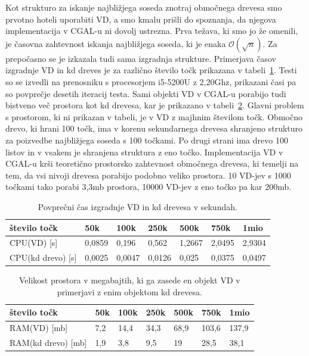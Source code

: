 \documentclass[a4paper, 12pt]{book}
\newcommand{\OO}{\ensuremath{\mathcal{O}}} %
\begin{document}
Kot strukturo za iskanje najbližjega soseda znotraj območnega drevesa smo prvotno hoteli uporabiti VD, a smo kmalu prišli do spoznanja, da njegova implementacija v CGAL-u ni dovolj ustrezna. Prva težava, ki smo jo že omenili, je časovna zahtevnost iskanja najbližjega soseda, ki je enaka $\OO(\sqrt{n})$. Za prepočasno se je izkazala tudi sama izgradnja strukture. Primerjava časov izgradnje VD in kd dreves je za različno število točk prikazana v tabeli~\ref{cpu-compare}. Testi so se izvedli na prenosniku s procesorjem i5-5200U z 2,20Ghz, prikazani časi pa so povprečje desetih iteracij testa. Sami objekti VD v CGAL-u porabijo tudi bistveno več prostora kot kd drevesa, kar je prikazano v tabeli~\ref{ram_compare}. Glavni problem s prostorom, ki ni prikazan v tabeli, je v VD z majhnim številom točk. Območno drevo, ki hrani 100 točk, ima v korenu sekundarnega drevesa shranjeno strukturo za poizvedbe najbližjega soseda s 100 točkami. Po drugi strani ima drevo 100 listov in v vsakem je shranjena struktura z eno točko. Implementacija VD v CGAL-u krši teoretično prostorsko zahtevnost območnega drevesa, ki temelji na tem, da vsi nivoji drevesa porabijo podobno veliko prostora. 10 VD-jev s 1000 točkami tako porabi 3,3mb prostora, 10000 VD-jev z eno točko pa kar 200mb.

\begin{table}
\begin{center}
\begin{tabular}{l|l|l|l|l|l|l}
\hline
število točk & 50k & 100k & 250k & 500k & 750k & 1mio \\ \hline \hline
CPU(VD) [s] & 0,0859 & 0,196 & 0,562 & 1,2667 & 2,0495 & 2,9304 \\ \hline
CPU(kd drevo) [s] & 0,0025 & 0,0047 & 0,0126 & 0,025 & 0,0375 & 0,0497
\end{tabular}
\caption{Povprečni čas izgradnje VD in kd drevesa v sekundah.}
\label{cpu-compare}
\end{center}
\end{table}

\begin{table}
\begin{center}
\begin{tabular}{l|l|l|l|l|l|l}
število točk & 50k & 100k & 250k & 500k & 750k & 1mio \\ \hline \hline
RAM(VD) [mb] & 7,2 & 14,4 & 34,3 & 68,9 & 103,6 & 137,9 \\ \hline
RAM(kd drevo) [mb] & 1,9 & 3,8 & 9,5 & 19 & 28,5 & 38,1
\end{tabular}
\caption{Velikost prostora v megabajtih, ki ga zasede en objekt VD v primerjavi z enim objektom kd drevesa.}
\label{ram_compare}
\end{center}
\end{table}
\end{document}
